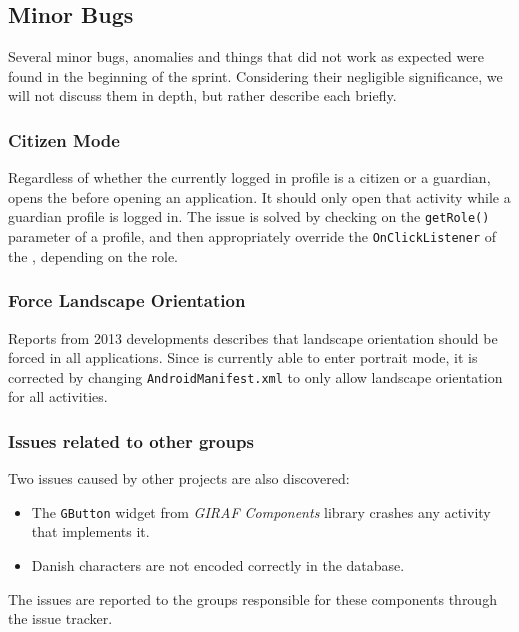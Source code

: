\subsection{Minor Bugs}

Several minor bugs, anomalies and things that did not work as expected were found in the beginning of the sprint.
Considering their negligible significance, we will not discuss them in depth, but rather describe each briefly.

\subsubsection{Citizen Mode}
Regardless of whether the currently logged in profile is a citizen or a guardian, \launcher opens the \profileselectionactivity before opening an application.
It should only open that activity while a guardian profile is logged in.
The issue is solved by checking on the \lstinline{getRole()} parameter of a profile, and then appropriately override the \lstinline{OnClickListener} of the \profileselectionactivity, depending on the role. 

\subsubsection{Force Landscape Orientation}
Reports from 2013 developments describes that landscape orientation should be forced in all \giraf applications\cite[p. 33]{2013report}.
Since \launcher is currently able to enter portrait mode, it is corrected by changing \lstinline{AndroidManifest.xml} to only allow landscape orientation for all activities\cite{appManifest}.

\subsubsection{Issues related to other groups}
Two issues caused by other projects are also discovered:

\begin{itemize}
\item The \lstinline{GButton} widget from \textit{GIRAF Components} library crashes any activity that implements it.
\item Danish characters are not encoded correctly in the database.
\end{itemize}

The issues are reported to the groups responsible for these components through the issue tracker.